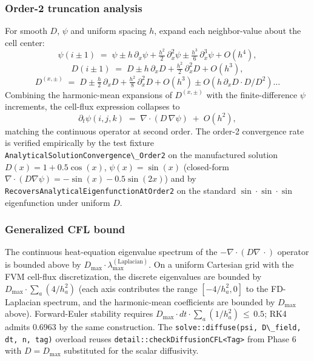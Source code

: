 \subsubsection{Order-2 truncation analysis}\label{phase14-order-2}

For smooth \(D\), \(\psi\) and uniform spacing \(h\), expand each
neighbor-value about the cell center:
\[
\psi(i \pm 1) \;=\; \psi \pm h\,\partial_x\psi + \tfrac{h^2}{2}\,\partial_x^2\psi \pm \tfrac{h^3}{6}\,\partial_x^3\psi + O(h^4),
\]
\[
D(i \pm 1) \;=\; D \pm h\,\partial_x D + \tfrac{h^2}{2}\,\partial_x^2 D + O(h^3),
\]
\[
D^{(x,\pm)} \;=\; D \pm \tfrac{h}{2}\,\partial_x D + \tfrac{h^2}{8}\,\partial_x^2 D + O(h^3) \pm O(h\,\partial_x D \cdot D / D^2) \dots
\]
Combining the harmonic-mean expansions of \(D^{(x,\pm)}\) with the
finite-difference \(\psi\) increments, the cell-flux expression
collapses to
\[
\partial_t\psi(i,j,k) \;=\; \nabla\!\cdot\!(D\,\nabla\psi) \;+\; O(h^2),
\]
matching the continuous operator at second order. The
order-2 convergence rate is verified empirically by the test fixture
\passthrough{\lstinline!AnalyticalSolutionConvergence\_Order2!} on
the manufactured solution
\(D(x) = 1 + 0.5\cos(x)\), \(\psi(x) = \sin(x)\) (closed-form
\(\nabla\cdot(D\nabla\psi) = -\sin(x) - 0.5\sin(2x)\)) and by
\passthrough{\lstinline!RecoversAnalyticalEigenfunctionAtOrder2!}
on the standard \(\sin\!\cdot\!\sin\!\cdot\!\sin\) eigenfunction
under uniform \(D\).

\subsubsection{Generalized CFL bound}\label{phase14-cfl}

The continuous heat-equation eigenvalue spectrum of the
\(-\nabla\!\cdot\!(D\nabla\,\cdot)\) operator is bounded above by
\(D_{\max}\!\cdot\!\lambda_{\max}^{(\text{Laplacian})}\). On a
uniform Cartesian grid with the FVM cell-flux discretization, the
discrete eigenvalues are bounded by
\(D_{\max}\!\cdot\!\sum_a (4/h_a^2)\) (each axis contributes the
range \([-4/h_a^2, 0]\) to the FD-Laplacian spectrum, and the
harmonic-mean coefficients are bounded by \(D_{\max}\) above).
Forward-Euler stability requires
\(D_{\max}\!\cdot\!dt\!\cdot\!\sum_a(1/h_a^2)\,\le\,0.5\); RK4
admits 0.6963 by the same construction. The
\passthrough{\lstinline!solve::diffuse(psi, D\_field, dt, n, tag)!}
overload reuses
\passthrough{\lstinline!detail::checkDiffusionCFL<Tag>!} from
Phase 6 with \(D = D_{\max}\) substituted for the scalar
diffusivity.

